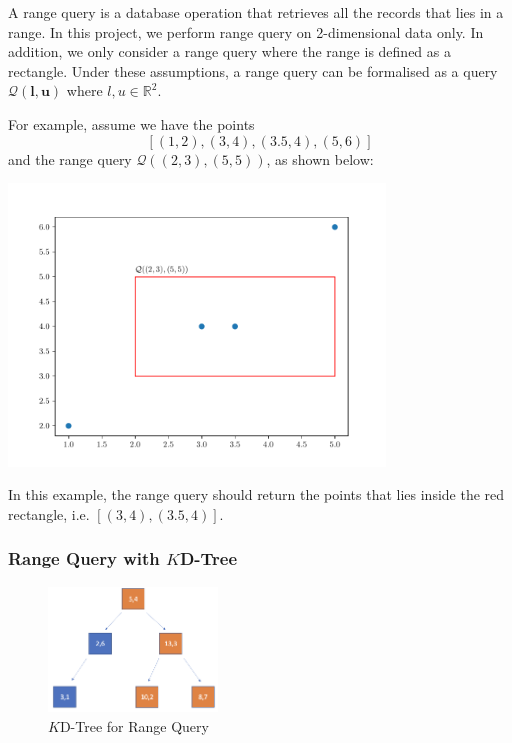 A range query is a database operation that retrieves all the records that lies in a range. In this project, we perform range query on 2-dimensional data only. In addition, we only consider a range query where the range is defined as a rectangle. Under these assumptions, a range query can be formalised as a query $\mathcal{Q}(\boldsymbol{l}, \boldsymbol{u})$ where $l,u\in\mathbb{R}^2$.

\begin{mscexample}
	For example, assume we have the points
	$$
	[(1,2), (3,4), (3.5, 4), (5,6)]
	$$
	and the range query $\mathcal{Q}((2,3), (5,5))$, as shown below:
	
	\begin{minipage}[t]{\linewidth}
	\centering
   	\includegraphics[width=10cm]{graphs/implementation/queries/range_query.pdf}
   	\label{fig:range_query_demo}
	\end{minipage}
	
In this example, the range query should return the points that lies inside the red rectangle, i.e. $[(3,4), (3.5, 4)]$.

\end{mscexample}

\subsubsection{Range Query with $K$D-Tree}


\begin{figure}[htp]
    \centering
    \includegraphics[width=0.4\textwidth]{graphs/Range_Query_Tree.png}
    \caption{$K$D-Tree for Range Query}
    \label{fig:KD-Tree_for_Range Query}
\end{figure}

